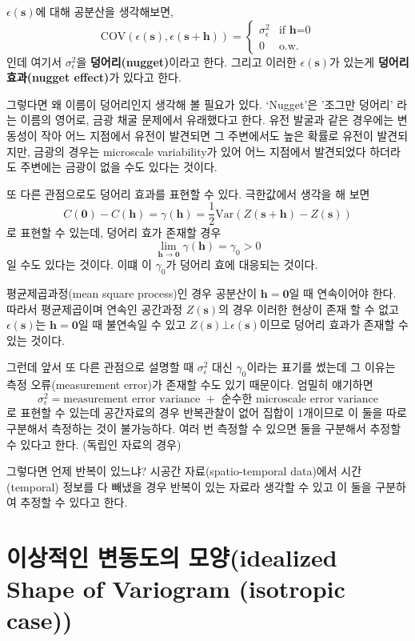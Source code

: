 \documentclass[b5paper,]{scrbook}
\theoremstyle{plain}
\theoremstyle{definition}
\numberwithin{equation}{section}
\begin{document}
\(\epsilon(\mathbf{s})\)에 대해 공분산을 생각해보면, \[
\text{COV}(\epsilon(\mathbf{s}),\epsilon(\mathbf{s}+\mathbf{h}))= \left\{ \begin{array}{ll}
\sigma_{\epsilon}^{2} & \textrm{if $\mathbf{h}$=0}\\
0 & \textrm{o.w.}
\end{array} \right.
\] 인데 여기서 \(\sigma_{\epsilon}^{2}\)을 \textbf{덩어리(nugget)}이라고
한다. 그리고 이러한 \(\epsilon(\mathbf{s})\)가 있는게 \textbf{덩어리
효과(nugget effect)}가 있다고 한다.

그렇다면 왜 이름이 덩어리인지 생각해 볼 필요가 있다. `Nugget'은 '조그만
덩어리' 라는 이름의 영어로, 금광 채굴 문제에서 유래했다고 한다. 유전
발굴과 같은 경우에는 변동성이 작아 어느 지점에서 유전이 발견되면 그
주변에서도 높은 확률로 유전이 발견되지만, 금광의 경우는 microscale
variability가 있어 어느 지점에서 발견되었다 하더라도 주변에는 금광이
없을 수도 있다는 것이다.

또 다른 관점으로도 덩어리 효과를 표현할 수 있다. 극한값에서 생각을 해
보면
\[C(\mathbf{0})-C(\mathbf{h})=\gamma(\mathbf{h})=\frac{1}{2}\text{Var}(Z(\mathbf{s}+\mathbf{h})-Z(\mathbf{s}))\]
로 표현할 수 있는데, 덩어리 효가 존재할 경우
\[\lim_{\mathbf{h}\rightarrow \mathbf{0}}\gamma(\mathbf{h})=\gamma_{0} >0\]
일 수도 있다는 것이다. 이떄 이 \(\gamma_{0}\)가 덩어리 효에 대응되는
것이다.

평균제곱과정(mean square process)인 경우 공분산이
\(\mathbf{h}=\mathbf{0}\)일 때 연속이어야 한다. 따라서 평균제곱이며
연속인 공간과정 \(Z(\mathbf{s})\)의 경우 이러한 현상이 존재 할 수 없고
\(\epsilon(\mathbf{s})\)는 \(\mathbf{h}=\mathbf{0}\)일 때 불연속일 수
있고 \(Z(\mathbf{s}) \bot \epsilon(\mathbf{s})\)이므로 덩어리 효과가
존재할 수 있는 것이다.

그런데 앞서 또 다른 관점으로 설명할 때 \(\sigma_{\epsilon}^{2}\) 대신
\(\gamma_{0}\)이라는 표기를 썼는데 그 이유는 측정 오류(measurement
error)가 존재할 수도 있기 때문이다. 엄밀히 얘기하면
\[\sigma_{\epsilon}^{2}=\text{measurement error variance } + \text{ 순수한 microscale error variance}\]
로 표현할 수 있는데 공간자료의 경우 반복관찰이 없어 집합이 1개이므로 이
둘을 따로 구분해서 측정하는 것이 불가능하다. 여러 번 측정할 수 있으면
둘을 구분해서 추정할 수 있다고 한다. (독립인 자료의 경우)

그렇다면 언제 반복이 있느냐? 시공간 자료(spatio-temporal data)에서
시간(temporal) 정보를 다 빼냈을 경우 반복이 있는 자료라 생각할 수 있고
이 둘을 구분하여 추정할 수 있다고 한다.

\section{이상적인 변동도의 모양(idealized Shape of Variogram (isotropic
case))}\label{--idealized-shape-of-variogram-isotropic-case}
\end{document}

